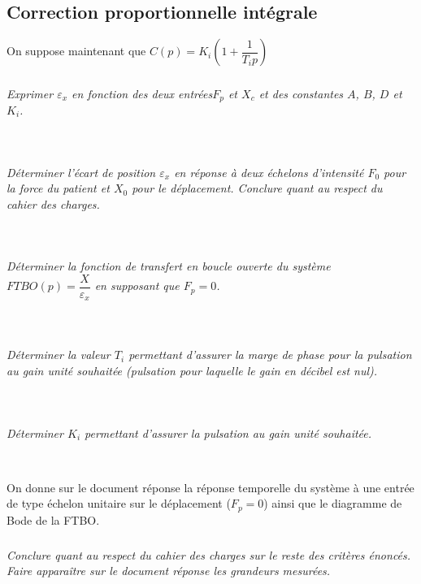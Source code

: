 \documentclass[10pt,fleqn]{article} %
\begin{document}
\begin{multicols}{2}
\subsection*{Correction proportionnelle intégrale}
On suppose maintenant que $C(p)=K_i\left(1+\dfrac{1}{T_ip}\right)$

\subparagraph{}\textit{Exprimer $\varepsilon_x$ en fonction des deux entrées$F_p$ et $X_c$ et des constantes $A$, $B$, $D$ et $K_i$.}
\ifprof
\begin{corrige}~\\
\end{corrige}
\else
\fi

\subparagraph{}\textit{Déterminer l'écart de position $\varepsilon_x$ en réponse à deux échelons d'intensité $F_0$ pour la force du patient et $X_0$ pour le déplacement. Conclure quant au respect du cahier des charges.}
\ifprof
\begin{corrige}~\\
\end{corrige}
\else
\fi


\subparagraph{}\textit{Déterminer la fonction de transfert en boucle ouverte du système $FTBO(p)=\dfrac{X}{\varepsilon_x}$ en supposant que $F_p=0$.}
\ifprof
\begin{corrige}~\\
\end{corrige}
\else
\fi

\subparagraph{}\textit{Déterminer la valeur $T_i$ permettant d'assurer la marge de phase pour la pulsation au gain unité souhaitée (pulsation pour laquelle le gain en décibel est nul).}
\ifprof
\begin{corrige}~\\
\end{corrige}
\else
\fi


\subparagraph{}\textit{Déterminer $K_i$ permettant d'assurer la pulsation au gain unité souhaitée.}


\ifprof
\begin{corrige}~\\
\end{corrige}
\else
\fi

On donne sur le document réponse la réponse temporelle du système à une entrée de type échelon unitaire sur le déplacement ($F_p=0$) ainsi que le diagramme de Bode de la FTBO.

\subparagraph{}\textit{Conclure quant au respect du cahier des charges sur le reste des critères énoncés. Faire apparaître sur le document réponse les grandeurs mesurées.}
\ifprof
\begin{corrige}~\\
\end{corrige}
\else
\fi

\end{multicols}
\end{document}
